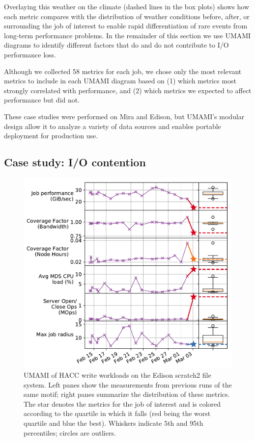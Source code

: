 Overlaying this weather on the climate (dashed lines in the box plots) shows how each metric compares with the distribution of weather conditions before, after, or surrounding the job of interest to enable rapid differentiation of rare events from long-term performance problems.
In the remainder of this section we use UMAMI diagrams to identify different factors that do and do not contribute to I/O performance loss.
{Although we collected 58 metrics for each job, we chose only the most relevant metrics to include in each UMAMI diagram based on (1) which metrics most strongly correlated with performance, and (2) which metrics we expected to affect performance but did not.

These case studies were performed on Mira and Edison, but UMAMI's modular design allow it to analyze a variety of data sources and enables portable deployment for production use.

\subsection{Case study: I/O contention}

\begin{figure}[t]
    \centering
    \includegraphics[width=1.0\columnwidth]{figs/umami-scratch2-hacc-write.pdf}
    \vspace{-.25in}
    \caption{UMAMI of HACC write workloads on the Edison scratch2 file system.
    Left panes show the measurements from previous runs of the same motif; right panes summarize the distribution of these metrics.
    The star denotes the metrics for the job of interest and is colored according to the quartile in which it falls (red being the worst quartile and blue the best).
    Whiskers indicate 5th and 95th percentiles; circles are outliers.}
    \label{fig:umami-scratch2-hacc-write}
    \vspace{-.2in}
\end{figure}

}
